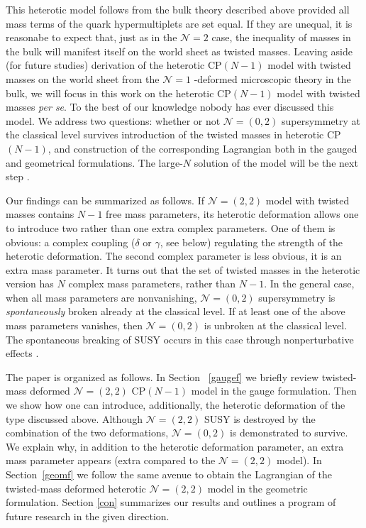 \documentclass[12pt]{article}
\newcommand{\ntwo}{${\mathcal N}=2$ }
\newcommand{\ntwot}{${\mathcal N}= \left(2,2\right) $ }
\newcommand{\ntwoo}{${\mathcal N}= \left(0,2\right) $ }
\newcommand{\none}{${\mathcal N}=1$ }
\begin{document}
 This heterotic model follows from the bulk theory   described above provided all
 mass terms of the quark hypermultiplets are set equal. If they are unequal,
 it is reasonabe to expect that, just as in the \ntwo case,
 the inequality of masses in the bulk will manifest itself  on the world sheet as
 twisted masses. Leaving aside (for future studies)
 derivation of the heterotic CP$(N-1)$ model with twisted masses on the world sheet
 from the \none-deformed microscopic theory in the bulk,
 we will focus in this work on the
  heterotic CP$(N-1)$ model with twisted masses {\em per se}. To the best of our knowledge
  nobody has ever discussed this model. 
  We address two questions: whether or not \ntwoo supersymmetry at the classical level
  survives introduction of the twisted masses in   heterotic CP$(N-1)$,
  and construction of the corresponding Lagrangian both in the gauged and geometrical formulations.
  The large-$N$ solution of the model will be the next step \cite{BSY5}.
  
  Our findings can be summarized as follows. If \ntwot model with twisted masses
  contains $N-1$ free mass parameters, its heterotic deformation allows one to introduce two rather than one 
  extra complex parameters. One of them is obvious: a complex coupling ($\delta$ or $\gamma$, see below)
 regulating the strength of the heterotic deformation. The second complex parameter is less obvious,
 it is an extra mass parameter. It turns out that the set of twisted masses
 in the heterotic version has $N$ complex mass parameters, rather than $N-1$.
 In the general case, when all mass parameters are nonvanishing, \ntwoo
 supersymmetry is {\em spontaneously} broken already at the classical level.
 If at least one of the above mass parameters vanishes, then \ntwoo is unbroken at the classical level.
 The spontaneous breaking of SUSY occurs in this case through nonperturbative effects \cite{BSY5}.
 
 The paper is organized as follows. In Section ~\ref{gaugef} we briefly review
 twisted-mass deformed \ntwot CP$(N-1)$ model in the gauge formulation.
 Then we show how one can introduce, additionally, the heterotic deformation of the type discussed above.
 Although \ntwot SUSY is destroyed by the combination of the two deformations,
 \ntwoo is demonstrated to survive.
 We explain why, in addition to the heterotic deformation parameter, an extra mass parameter appears (extra
 compared to the \ntwot model). 
 \newpage
 In Section~\ref{geomf} we follow the same avenue to obtain 
 the Lagrangian of the  twisted-mass deformed heterotic  \ntwot model in the geometric formulation.
 Section \ref{con} summarizes our results and outlines a program of future research in the given direction.
\end{document}

